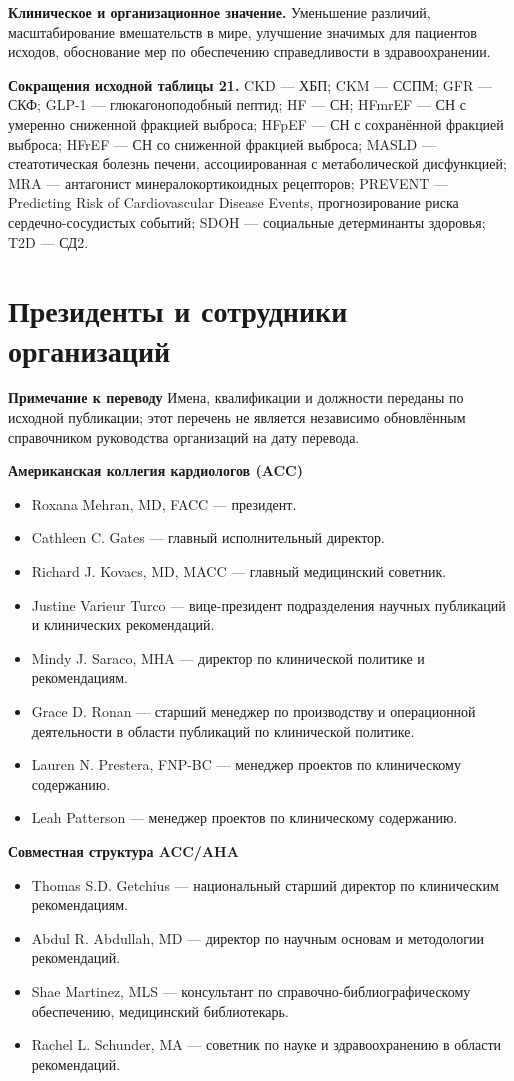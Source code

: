 \documentclass[11pt,a4paper]{article}
\newcommand{\editorial}[1]{\par\begingroup\small\color{black!70}\textbf{Примечание к переводу} #1\par\endgroup}
\newcommand{\heading}[1]{\par\medskip\textbf{#1}\par}
\begin{document}
\textbf{Клиническое и организационное значение.} Уменьшение различий, масштабирование вмешательств в мире, улучшение значимых для пациентов исходов, обоснование мер по обеспечению справедливости в здравоохранении.

\textbf{Сокращения исходной таблицы 21.} CKD --- ХБП; CKM --- ССПМ; GFR --- СКФ; GLP-1 --- глюкагоноподобный пептид; HF --- СН; HFmrEF --- СН с умеренно сниженной фракцией выброса; HFpEF --- СН с сохранённой фракцией выброса; HFrEF --- СН со сниженной фракцией выброса; MASLD --- стеатотическая болезнь печени, ассоциированная с метаболической дисфункцией; MRA --- антагонист минералокортикоидных рецепторов; PREVENT --- Predicting Risk of Cardiovascular Disease Events, прогнозирование риска сердечно-сосудистых событий; SDOH --- социальные детерминанты здоровья; T2D --- СД2.

\section*{Президенты и сотрудники организаций}
\editorial{Имена, квалификации и должности переданы по исходной публикации; этот перечень не является независимо обновлённым справочником руководства организаций на дату перевода.}

\heading{Американская коллегия кардиологов (ACC)}
\begin{itemize}
\item Roxana Mehran, MD, FACC --- президент.
\item Cathleen C. Gates --- главный исполнительный директор.
\item Richard J. Kovacs, MD, MACC --- главный медицинский советник.
\item Justine Varieur Turco --- вице-президент подразделения научных публикаций и клинических рекомендаций.
\item Mindy J. Saraco, MHA --- директор по клинической политике и рекомендациям.
\item Grace D. Ronan --- старший менеджер по производству и операционной деятельности в области публикаций по клинической политике.
\item Lauren N. Prestera, FNP-BC --- менеджер проектов по клиническому содержанию.
\item Leah Patterson --- менеджер проектов по клиническому содержанию.
\end{itemize}

\heading{Совместная структура ACC/AHA}
\begin{itemize}
\item Thomas S.D. Getchius --- национальный старший директор по клиническим рекомендациям.
\item Abdul R. Abdullah, MD --- директор по научным основам и методологии рекомендаций.
\item Shae Martinez, MLS --- консультант по справочно-библиографическому обеспечению, медицинский библиотекарь.
\item Rachel L. Schunder, MA --- советник по науке и здравоохранению в области рекомендаций.
\end{itemize}
\end{document}
